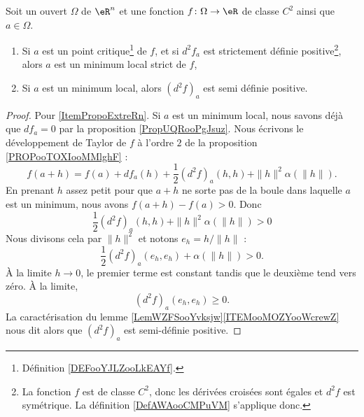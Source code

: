 \begin{proposition}     \label{PropoExtreRn}
    Soit un ouvert \( \Omega\) de \( \eR^n\) et une fonction \( f\colon \Omega\to \eR\) de classe \( C^2\) ainsi que \( a\in\Omega\).
    \begin{enumerate}
        \item   \label{ITEMooCVFVooWltGqI}
            Si $a$ est un point critique\footnote{Définition \ref{DEFooYJLZooLkEAYf}.} de $f$, et si $d^2f_a$ est strictement définie positive\footnote{La fonction \( f\) est de classe \( C^2\), donc les dérivées croisées sont égales et \( d^2f\) est symétrique. La définition \ref{DefAWAooCMPuVM} s'applique donc.}, alors $a$ est un minimum local strict de $f$,
        \item\label{ItemPropoExtreRn}
            Si $a$ est un minimum local, alors $(d^2f)_a$ est semi définie positive.
    \end{enumerate}
\end{proposition}

\begin{proof}
    Pour \ref{ItemPropoExtreRn}. Si \( a\) est un minimum local, nous savons déjà que \( df_a=0\) par la proposition \ref{PropUQRooPgJsuz}. Nous écrivons le développement de Taylor de \( f\) à l'ordre \( 2\) de la proposition \ref{PROPooTOXIooMMlghF} :
    \begin{equation}
        f(a+h)=f(a)+df_a(h)+\frac{ 1 }{2}(d^2f)_a(h,h)+\| h \|^2\alpha(\| h \|).
    \end{equation}
    En prenant \( h\) assez petit pour que \( a+h\) ne sorte pas de la boule dans laquelle \( a\) est un minimum, nous avons \( f(a+h)-f(a)>0\). Donc
    \begin{equation}
        \frac{ 1 }{2}(d^2f)_a(h,h)+\| h \|^2\alpha(\| h \|)>0
    \end{equation}
    Nous divisons cela par \( \| h \|^2\) et notons \( e_h=h/\| h \|\) :
    \begin{equation}
        \frac{ 1 }{2}(d^2f)_a(e_h,e_h)+\alpha(\| h \|)>0.
    \end{equation}
    À la limite \( h\to 0\), le premier terme est constant tandis que le deuxième tend vers zéro. À la limite,
    \begin{equation}
        (d^2f)_a(e_h,e_h)\geq 0.
    \end{equation}
    La caractérisation du lemme \ref{LemWZFSooYvksjw}\ref{ITEMooMOZYooWcrewZ} nous dit alors que \( (d^2f)_a\) est semi-définie positive.
\end{proof}

